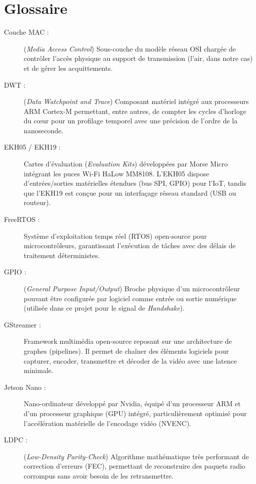 \section*{Glossaire}

\begin{description}
    \item[Couche MAC :] (\textit{Media Access Control}) Sous-couche du modèle réseau OSI chargée de contrôler l'accès physique au support de transmission (l'air, dans notre cas) et de gérer les acquittements.
    
    \item[DWT :] (\textit{Data Watchpoint and Trace}) Composant matériel intégré aux processeurs ARM Cortex-M permettant, entre autres, de compter les cycles d'horloge du cœur pour un profilage temporel avec une précision de l'ordre de la nanoseconde.
    
    \item[EKH05 / EKH19 :] Cartes d'évaluation (\textit{Evaluation Kits}) développées par Morse Micro intégrant les puces Wi-Fi HaLow MM8108. L'EKH05 dispose d'entrées/sorties matérielles étendues (bus SPI, GPIO) pour l'IoT, tandis que l'EKH19 est conçue pour un interfaçage réseau standard (USB ou routeur).
    
    \item[FreeRTOS :] Système d'exploitation temps réel (RTOS) open-source pour microcontrôleurs, garantissant l'exécution de tâches avec des délais de traitement déterministes.
    
    \item[GPIO :] (\textit{General Purpose Input/Output}) Broche physique d'un microcontrôleur pouvant être configurée par logiciel comme entrée ou sortie numérique (utilisée dans ce projet pour le signal de \textit{Handshake}).
    
    \item[GStreamer :] Framework multimédia open-source reposant sur une architecture de graphes (pipelines). Il permet de chaîner des éléments logiciels pour capturer, encoder, transmettre et décoder de la vidéo avec une latence minimale.
    
    \item[Jetson Nano :] Nano-ordinateur développé par Nvidia, équipé d'un processeur ARM et d'un processeur graphique (GPU) intégré, particulièrement optimisé pour l'accélération matérielle de l'encodage vidéo (NVENC).
    
    \item[LDPC :] (\textit{Low-Density Parity-Check}) Algorithme mathématique très performant de correction d'erreurs (FEC), permettant de reconstruire des paquets radio corrompus sans avoir besoin de les retransmettre.
    

\end{description}
